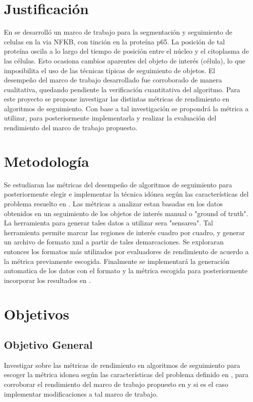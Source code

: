 \documentclass[spanish]{article}
\begin{document}
\section{Justificación}

En \cite{Calderon2014} se desarrolló un marco de trabajo para la segmentación y seguimiento de celulas en la via NFKB, con tinción en la proteína p65. La posición de tal proteína oscila a lo largo del tiempo de posición entre el núcleo y el citoplasma de las células. Esto ocasiona cambios aparentes del objeto de interés (célula), lo que imposibilita el uso de las técnicas típicas de seguimiento de objetos. El desempeño del marco de trabajo desarrollado fue corroborado de manera cualitativa, quedando pendiente la verificación cuantitativa del algoritmo. Para este proyecto se propone investigar las distintas métricas de rendimiento en algoritmos de seguimiento. Con base a tal investigación se propondrá la métrica a utilizar, para posteriormente implementarla y realizar la evaluación del rendimiento del marco de trabajo propuesto.
\section{Metodología}
Se estudiaran las métricas del desempeño de algoritmos de seguimiento para posteriormente elegir e implementar la técnica idónea según las características del problema resuelto en \cite{Calderon2014}. Las métricas a analizar estan basadas en los datos obtenidos en un seguimiento de los objetos de interés manual o "ground of truth". La herramienta para generar tales datos a utilizar sera "sensarea". Tal herramienta permite marcar las regiones de interés cuadro por cuadro, y generar un archivo de formato xml a partir de tales demarcaciones. Se exploraran entonces los formatos más utilizados por evaluadores de rendimiento de acuerdo a la métrica previamente escogida. Finalmente se implementará la generación automatica de los datos con el formato y la métrica escogida para posteriormente incorporar los resultados en \cite{Calderon2014}.

\section{Objetivos}

\subsection{Objetivo General}
Investigar sobre las métricas de rendimiento en algoritmos de seguimiento para escoger la métrica idonea según las características del problema definido en \cite{Calderon2014}, para corroborar el rendimiento del marco de trabajo propuesto en \cite{Calderon2014} y si es el caso implementar modificaciones a tal marco de trabajo. 
\end{document}
